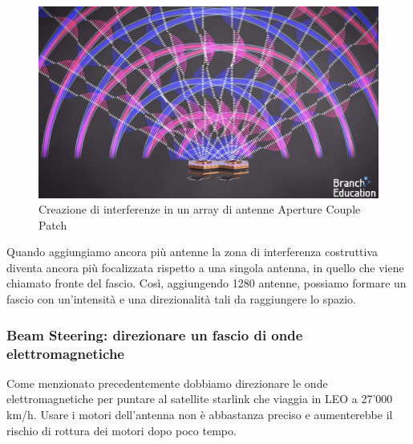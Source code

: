 \begin{figure}[htbp]
  \centering
  \includegraphics[width=0.8\linewidth]{./res/img/antenna_interference.png}
  \caption{Creazione di interferenze in un array di antenne Aperture Couple Patch \cite{branch_education_how_2022}}
  \label{fig:aperture-couple-patch-antenna-interference}
\end{figure}

Quando aggiungiamo ancora più antenne la zona di interferenza costruttiva diventa ancora più focalizzata rispetto a una singola antenna, in quello che viene chiamato fronte del fascio.
Così, aggiungendo 1280 antenne, possiamo formare un fascio con un'intensità e una direzionalità tali da raggiungere lo spazio.


\subsubsection{Beam Steering: direzionare un fascio di onde elettromagnetiche}
Come menzionato precedentemente dobbiamo direzionare le onde elettromagnetiche per puntare al satellite starlink che viaggia in \ac{LEO} a 27'000 km/h.
Usare i motori dell'antenna non è abbastanza preciso e aumenterebbe il rischio di rottura dei motori dopo poco tempo.

